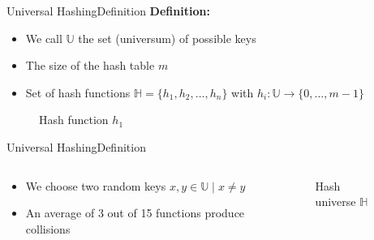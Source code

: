 
\begin{frame}{Universal Hashing}{Definition}
  \textbf{Definition:}
  \begin{itemize}
    \item
      We call $\mathbb{U}$ the set (universum) of possible keys
    \item
      The size of the hash table $m$
    \item
      Set of hash functions $\mathbb{H} = \{h_1, h_2,\dots, h_n\}$ with
      $h_i: \mathbb{U} \to \{0,\dots, m - 1\}$
  \end{itemize}%
  \begin{figure}[!b]%
    \centering%
    \vspace*{-1.0em}%
    \caption{Hash function $h_1$}%
    \label{fig:hash_function_definition}
  \end{figure}
\end{frame}


\begin{frame}{Universal Hashing}{Definition}
  \begin{columns}
    \begin{column}{0.5\linewidth}
      \begin{itemize}
        \item
          We choose two random keys $x, y \in \mathbb{U} \mid x \neq 
          y$
        \item
          An average of 3 out of 15 functions produce collisions
      \end{itemize}
    \end{column}
    \begin{column}{0.5\linewidth}
      \begin{figure}[!t]%
        \centering%
        \caption{Hash universe $\mathbb{H}$}%
        \label{fig:hash_universe}
      \end{figure}
    \end{column}
  \end{columns}
\end{frame}


